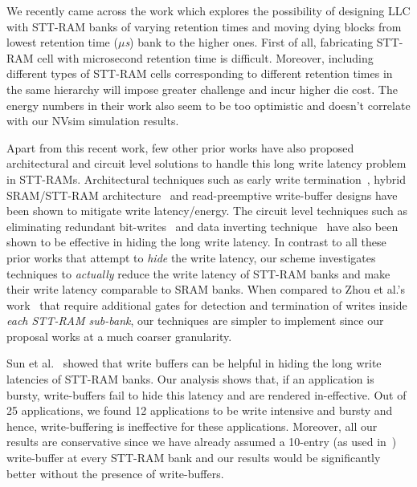 We recently came across the work which explores the possibility of designing LLC with STT-RAM banks of varying
retention times and moving dying blocks from lowest retention time ({\it $\mu$s}) bank to the higher ones. First of all, fabricating STT-RAM cell with microsecond retention time is difficult. Moreover, including different types of STT-RAM cells corresponding to different retention times in the same hierarchy will impose greater challenge and incur higher die cost. The energy numbers in their work also seem to be too optimistic and doesn't correlate with our NVsim simulation results.

Apart from this recent work, few other prior works have also proposed architectural and circuit level
solutions to handle this long write latency problem in STT-RAMs. Architectural techniques such as
early write termination~\cite{mram-energy-reduction}, hybrid SRAM/STT-RAM
architecture~\cite{gsun-hpca, Qureshi:2009:SHPMM} and read-preemptive write-buffer designs have been
shown to mitigate write latency/energy. The circuit level techniques such as eliminating redundant
bit-writes~\cite{mram-energy-reduction} and data inverting technique~\cite{gsun-hpca} have also been
shown to be effective in hiding the long write latency. In contrast to all these prior works that
attempt to {\it hide} the write latency, our scheme investigates techniques to {\it actually} reduce
the write latency of STT-RAM banks and make their write latency comparable to SRAM banks. When
compared to Zhou et al.'s work~\cite{mram-energy-reduction} that require additional gates for
detection and termination of writes inside {\it each STT-RAM sub-bank}, our techniques are simpler to
implement since our proposal works at a much coarser granularity.

Sun et al.~\cite{gsun-hpca} showed that write buffers can be helpful in hiding the long write
latencies of STT-RAM banks. Our analysis shows that, if an application is bursty, write-buffers fail
to hide this latency and are rendered in-effective. Out of 25 applications, we found 12 applications
to be write intensive and bursty and hence, write-buffering is ineffective for these applications.
Moreover, all our results are conservative since we have already assumed a 10-entry (as used
in~\cite{gsun-hpca}) write-buffer at every STT-RAM bank and our results would be significantly better
without the presence of write-buffers.

